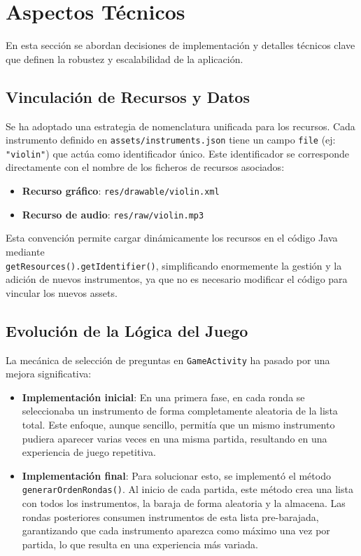 \documentclass{article}
\begin{document}
\section{Aspectos Técnicos}

En esta sección se abordan decisiones de implementación y detalles técnicos clave que definen la robustez y escalabilidad de la aplicación.

\subsection{Vinculación de Recursos y Datos}
Se ha adoptado una estrategia de nomenclatura unificada para los recursos. Cada instrumento definido en \texttt{assets/instruments.json} tiene un campo \texttt{file} (ej: \texttt{"violin"}) que actúa como identificador único. Este identificador se corresponde directamente con el nombre de los ficheros de recursos asociados:
\begin{itemize}
    \item \textbf{Recurso gráfico}: \texttt{res/drawable/violin.xml}
    \item \textbf{Recurso de audio}: \texttt{res/raw/violin.mp3}
\end{itemize}
Esta convención permite cargar dinámicamente los recursos en el código Java mediante \\
\texttt{getResources().getIdentifier()}, simplificando enormemente la gestión y la adición de nuevos instrumentos, ya que no es necesario modificar el código para vincular los nuevos assets.

\subsection{Evolución de la Lógica del Juego}
La mecánica de selección de preguntas en \texttt{GameActivity} ha pasado por una mejora significativa:
\begin{itemize}
    \item \textbf{Implementación inicial}: En una primera fase, en cada ronda se seleccionaba un instrumento de forma completamente aleatoria de la lista total. Este enfoque, aunque sencillo, permitía que un mismo instrumento pudiera aparecer varias veces en una misma partida, resultando en una experiencia de juego repetitiva.
    \item \textbf{Implementación final}: Para solucionar esto, se implementó el método \texttt{generarOrdenRondas()}. Al inicio de cada partida, este método crea una lista con todos los instrumentos, la baraja de forma aleatoria y la almacena. Las rondas posteriores consumen instrumentos de esta lista pre-barajada, garantizando que cada instrumento aparezca como máximo una vez por partida, lo que resulta en una experiencia más variada.
\end{itemize}
\end{document}
